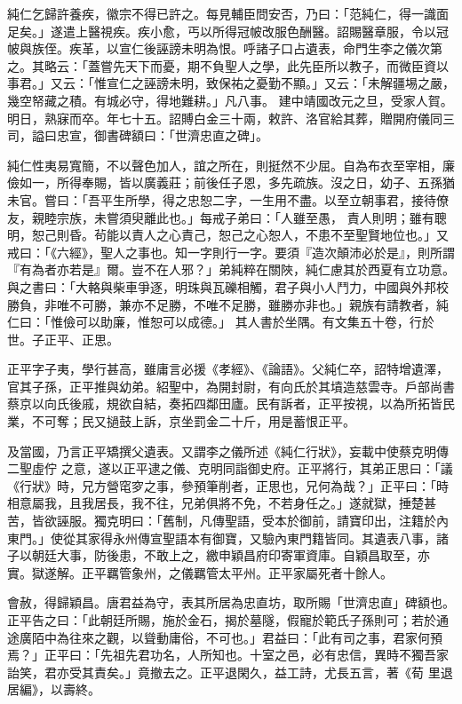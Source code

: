 \begin{pinyinscope}
 純仁乞歸許養疾，徽宗不得已許之。每見輔臣問安否，乃曰：「范純仁，得一識面足矣。」遂遣上醫視疾。疾小愈，丐以所得冠帔改服色酬醫。詔賜醫章服，令以冠帔與族侄。疾革，以宣仁後誣謗未明為恨。呼諸子口占遺表，命門生李之儀次第之。其略云：「蓋嘗先天下而憂，期不負聖人之學，此先臣所以教子，而微臣資以事君。」又云：「惟宣仁之誣謗未明，致保祐之憂勤不顯。」又云：「未解疆埸之嚴，幾空帑藏之積。有城必守，得地難耕。」凡八事。
 建中靖國改元之旦，受家人賀。明日，熟寐而卒。年七十五。詔賻白金三十兩，敕許、洛官給其葬，贈開府儀同三司，謚曰忠宣，御書碑額曰：「世濟忠直之碑」。



 純仁性夷易寬簡，不以聲色加人，誼之所在，則挺然不少屈。自為布衣至宰相，廉儉如一，所得奉賜，皆以廣義莊；前後任子恩，多先疏族。沒之日，幼子、五孫猶未官。嘗曰：「吾平生所學，得之忠恕二字，一生用不盡。以至立朝事君，接待僚友，親睦宗族，未嘗須臾離此也。」每戒子弟曰：「人雖至愚，
 責人則明；雖有聰明，恕己則昏。茍能以責人之心責己，恕己之心恕人，不患不至聖賢地位也。」又戒曰：「《六經》，聖人之事也。知一字則行一字。要須『造次顛沛必於是』，則所謂『有為者亦若是』爾。豈不在人邪？」弟純粹在關陜，純仁慮其於西夏有立功意。與之書曰：「大輅與柴車爭逐，明珠與瓦礫相觸，君子與小人鬥力，中國與外邦校勝負，非唯不可勝，兼亦不足勝，不唯不足勝，雖勝亦非也。」親族有請教者，純仁曰：「惟儉可以助廉，惟恕可以成德。」
 其人書於坐隅。有文集五十卷，行於世。子正平、正思。



 正平字子夷，學行甚高，雖庸言必援《孝經》、《論語》。父純仁卒，詔特增遺澤，官其子孫，正平推與幼弟。紹聖中，為開封尉，有向氏於其墳造慈雲寺。戶部尚書蔡京以向氏後戚，規欲自結，奏拓四鄰田廬。民有訴者，正平按視，以為所拓皆民業，不可奪；民又撾鼓上訴，京坐罰金二十斤，用是蓄恨正平。



 及當國，乃言正平矯撰父遺表。又謂李之儀所述《純仁行狀》，妄載中使蔡克明傳二聖虛佇
 之意，遂以正平逮之儀、克明同詣御史府。正平將行，其弟正思曰：「議《行狀》時，兄方營窀穸之事，參預筆削者，正思也，兄何為哉？」正平曰：「時相意屬我，且我居長，我不往，兄弟俱將不免，不若身任之。」遂就獄，捶楚甚苦，皆欲誣服。獨克明曰：「舊制，凡傳聖語，受本於御前，請寶印出，注籍於內東門。」使從其家得永州傳宣聖語本有御寶，又驗內東門籍皆同。其遺表八事，諸子以朝廷大事，防後患，不敢上之，繳申穎昌府印寄軍資庫。自穎昌取至，亦
 實。獄遂解。正平羈管象州，之儀羈管太平州。正平家屬死者十餘人。



 會赦，得歸穎昌。唐君益為守，表其所居為忠直坊，取所賜「世濟忠直」碑額也。正平告之曰：「此朝廷所賜，施於金石，揭於墓隧，假寵於範氏子孫則可；若於通途廣陌中為往來之觀，以聳動庸俗，不可也。」君益曰：「此有司之事，君家何預焉？」正平曰：「先祖先君功名，人所知也。十室之邑，必有忠信，異時不獨吾家詒笑，君亦受其責矣。」竟撤去之。正平退閑久，益工詩，尤長五言，著《荀
 里退居編》，以壽終。




\end{pinyinscope}
